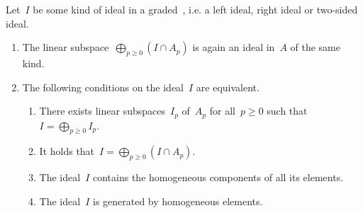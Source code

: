 \begin{lemma}
  \label{characterizations of homogeneous ideals}
  Let~$I$ be some kind of ideal in a graded~{\algebra{$\kf$}}, i.e. a left ideal, right ideal or two-sided ideal.
  \begin{enumerate}
    \item
      The linear subspace~$\bigoplus_{p \geq 0} (I \cap A_p)$ is again an ideal in~$A$ of the same kind.
    \item
      The following conditions on the ideal~$I$ are equivalent.
      \begin{enumerate}
        \item
          \label{direct sum of linear subspaces}
          There exists linear subspaces~$I_p$ of~$A_p$ for all~$p \geq 0$ such that~$I = \bigoplus_{p \geq 0} I_p$.
        \item
          \label{direct sum of intersections}
          It holds that~$I = \bigoplus_{p \geq 0} (I \cap A_p)$.
        \item
          \label{contains all homogeneous components}
          The ideal~$I$ contains the homogeneous components of all its elements.
        \item
          \label{generated by homogeneous}
          The ideal~$I$ is generated by homogeneous elements.
      \end{enumerate}
  \end{enumerate}
\end{lemma}



